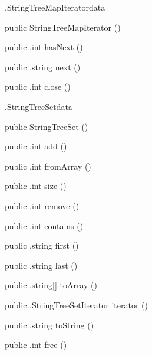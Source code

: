 \begin{CrexxClass}{.StringTreeMapIterator}{data}

  \begin{Hierarchy}
  \end{Hierarchy}

  \begin{Members}

    \Factory
      {public}
      {StringTreeMapIterator}
      {()}

    \Method
      {public}
      {.int}
      {hasNext}
      {()}

    \Method
      {public}
      {.string}
      {next}
      {()}

    \Method
      {public}
      {.int}
      {close}
      {()}

  \end{Members}
\end{CrexxClass}

\begin{CrexxClass}{.StringTreeSet}{data}

  \begin{Hierarchy}
  \end{Hierarchy}

  \begin{Members}

    \Factory
      {public}
      {StringTreeSet}
      {()}

    \Method
      {public}
      {.int}
      {add}
      {()}

    \Method
      {public}
      {.int}
      {fromArray}
      {()}

    \Method
      {public}
      {.int}
      {size}
      {()}

    \Method
      {public}
      {.int}
      {remove}
      {()}

    \Method
      {public}
      {.int}
      {contains}
      {()}

    \Method
      {public}
      {.string}
      {first}
      {()}

    \Method
      {public}
      {.string}
      {last}
      {()}

    \Method
      {public}
      {.string[]}
      {toArray}
      {()}

    \Method
      {public}
      {.StringTreeSetIterator}
      {iterator}
      {()}

    \Method
      {public}
      {.string}
      {toString}
      {()}

    \Method
      {public}
      {.int}
      {free}
      {()}

  \end{Members}
\end{CrexxClass}

